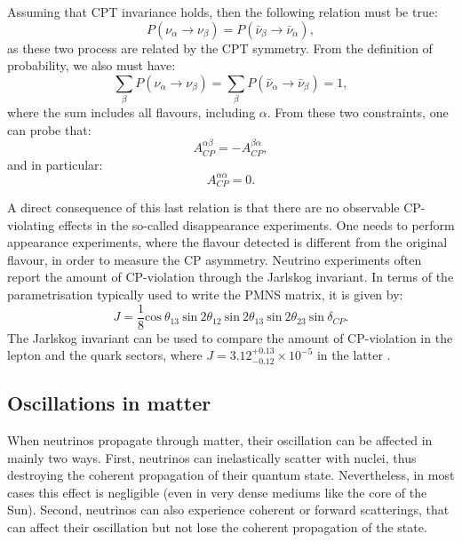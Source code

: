 Assuming that CPT invariance holds, then the following relation must be true:
\begin{equation}
	P(\nu_{\alpha} \rightarrow \nu_{\beta}) = P(\bar{\nu}_{\beta} \rightarrow \bar{\nu}_{\alpha}),
\end{equation}
as these two process are related by the CPT symmetry. From the definition of probability, we also must have:
\begin{equation}
	\sum_{\beta} P(\nu_{\alpha} \rightarrow \nu_{\beta}) = \sum_{\beta} P(\bar{\nu}_{\alpha} \rightarrow \bar{\nu}_{\beta}) = 1,
\end{equation}
where the sum includes all flavours, including $\alpha$. From these two constraints, one can probe that:
\begin{equation}
	A^{\alpha\beta}_{CP} = - A^{\beta\alpha}_{CP},
\end{equation}
and in particular:
\begin{equation}
	A^{\alpha\alpha}_{CP} = 0.
\end{equation}

A direct consequence of this last relation is that there are no observable CP-violating effects in the so-called disappearance experiments. One needs to perform appearance experiments, where the flavour detected is different from the original flavour, in order to measure the CP asymmetry. Neutrino experiments often report the amount of CP-violation through the Jarlskog invariant. In terms of the parametrisation typically used to write the PMNS matrix, it is given by:
\begin{equation}
	J = \frac{1}{8} \mathrm{cos}~\theta_{13}~\mathrm{sin}~2\theta_{12}~\mathrm{sin}~2\theta_{13}~\mathrm{sin}~2\theta_{23}~\mathrm{sin}~\delta_{CP}.
\end{equation}
The Jarlskog invariant can be used to compare the amount of CP-violation in the lepton and the quark sectors, where $J=3.12^{+0.13}_{-0.12} \times 10^{-5}$ in the latter \cite{ParticleDataGroup2024}.

\subsection{Oscillations in matter}

When neutrinos propagate through matter, their oscillation can be affected in mainly two ways. First, neutrinos can inelastically scatter with nuclei, thus destroying the coherent propagation of their quantum state. Nevertheless, in most cases this effect is negligible (even in very dense mediums like the core of the Sun). Second, neutrinos can also experience coherent or forward scatterings, that can affect their oscillation but not lose the coherent propagation of the state.

